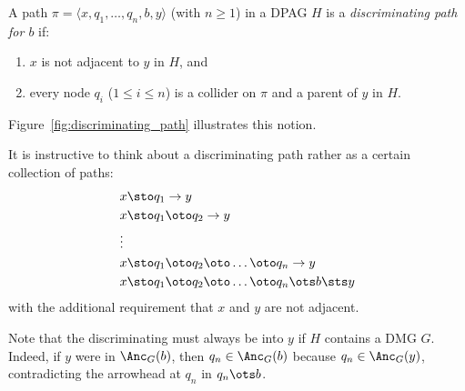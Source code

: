 \begin{Def}\label{def:discriminating_path}
  A path $\pi = \langle x, q_1, \dots, q_n, b, y\rangle$ (with $n \ge 1$) in a DPAG $H$ is
  a \emph{discriminating path for $b$} if:
  \begin{enumerate}[label=(\roman*)]
    \item $x$ is not adjacent to $y$ in $H$, and
    \item every node $q_i$ ($1 \le i \le n$) is a collider on $\pi$ and a parent of $y$ in $H$.
  \end{enumerate}
\end{Def}
Figure~\ref{fig:discriminating_path} illustrates this notion.
\begin{Rem}\label{rem:discriminating_path}
  It is instructive to think about a discriminating path rather as a certain collection of paths:
  \begin{align*}
    &x \sto q_1 \to y \\
    &x \sto q_1 \oto q_2 \to y \\
    &\vdots \\
    &x \sto q_1 \oto q_2 \oto \dots \oto q_n \to y \\
    &x \sto q_1 \oto q_2 \oto \dots \oto q_n \ots b \sts y
  \end{align*}
  with the additional requirement that $x$ and $y$ are not adjacent.
\end{Rem}
\begin{Rem}
Note that the discriminating must always be into $y$ if $H$ contains a DMG $G$. 
Indeed, if $y$ were in $\Anc_G(b)$, then $q_n \in \Anc_G(b)$ because $q_n \in \Anc_G(y)$,
contradicting the arrowhead at $q_n$ in $q_n \ots b$.
\end{Rem}

